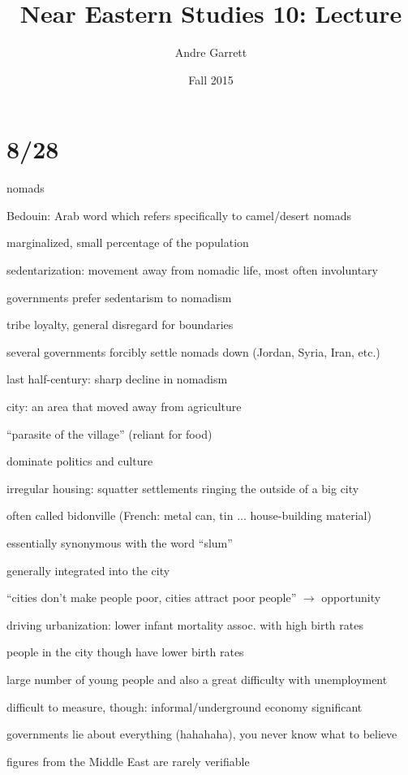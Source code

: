 \documentclass[12pt]{article}
\title{Near Eastern Studies 10: Lecture}
\author{Andre Garrett}
\date{\normalsize Fall 2015}
\begin{document}
\maketitle

\section{8/28}

\noindent
nomads

Bedouin: Arab word which refers specifically to camel/desert nomads

marginalized, small percentage of the population

\noindent
sedentarization: movement away from nomadic life, most often involuntary

governments prefer sedentarism to nomadism

tribe loyalty, general disregard for boundaries

several governments forcibly settle nomads down (Jordan, Syria, Iran, etc.)

last half-century: sharp decline in nomadism

\noindent
city: an area that moved away from agriculture

``parasite of the village'' (reliant for food)

dominate politics and culture

\noindent
irregular housing: squatter settlements ringing the outside of a big city

often called bidonville (French: metal can, tin ... house-building material)

essentially synonymous with the word ``slum''

generally integrated into the city

``cities don't make people poor, cities attract poor people'' $\to$ opportunity

driving urbanization: lower infant mortality assoc. with high birth rates

people in the city though have lower birth rates

\noindent
large number of young people and also a great difficulty with unemployment

difficult to measure, though: informal/underground economy significant

governments lie about everything (hahahaha), you never know what to believe

figures from the Middle East are rarely verifiable
\end{document}
